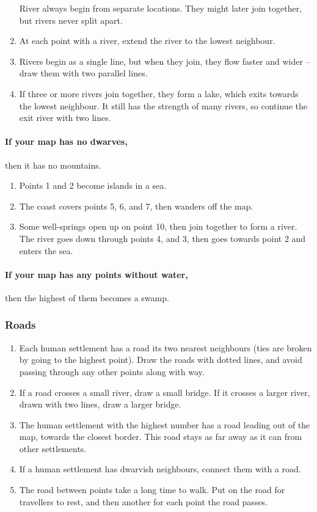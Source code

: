 \begin{multicols}{2}
\begin{enumerate}
  River always begin from separate locations.
  They might later join together, but rivers never split apart.
  \item
  At each point with a river, extend the river to the lowest neighbour.
  \item
  Rivers begin as a single line, but when they join, they flow faster and wider -- draw them with two parallel lines.
  \item
  If three or more rivers join together, they form a lake, which exits towards the lowest neighbour.
  It still has the strength of many rivers, so continue the exit river with two lines.
\end{enumerate}

\paragraph{If your map has no dwarves,}
then it has no mountains.

\begin{enumerate}
  \item
  Points 1 and 2 become islands in a sea.
  \item
  The coast covers points 5, 6, and 7, then wanders off the map.
  \item
  Some well-springs open up on point 10, then join together to form a river.
  The river goes down through points 4, and 3, then goes towards point 2 and enters the sea.
\end{enumerate}

\paragraph{If your map has any points without water,}
then the highest of them becomes a swamp.

\subsubsection{Roads}

\begin{enumerate}
  \item
  Each human settlement has a road its two nearest neighbours (ties are broken by going to the highest point).
  Draw the roads with dotted lines, and avoid passing through any other points along with way.
  \item
  If a road crosses a small river, draw a small bridge.
  If it crosses a larger river, drawn with two lines, draw a larger bridge.
  \item
  The human settlement with the highest number has a road leading out of the map, towards the closest border.
  This road stays as far away as it can from other settlements.
  \label{roadOut}
  \item
  If a human settlement has dwarvish neighbours, connect them with a road.
  \item
  The road between points take a long time to walk.
  Put  on the road for travellers to rest, and then another for each point the road passes.
\end{enumerate}


\end{multicols}
